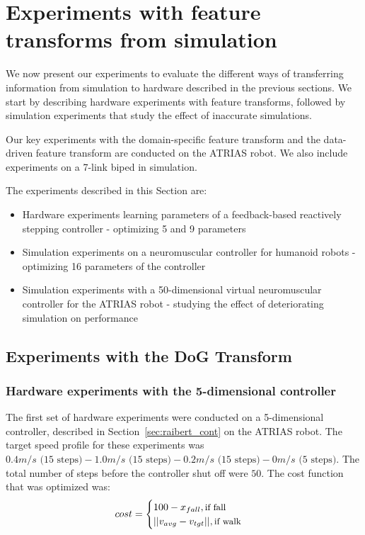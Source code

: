 \chapter{Experiments with feature transforms from simulation}


We now present our experiments to evaluate the different ways of transferring information from simulation to hardware described in the previous sections. We start by describing hardware experiments with feature transforms, followed by simulation experiments that study the effect of inaccurate simulations. 


Our key experiments with the domain-specific feature transform and the data-driven feature transform are conducted on the ATRIAS robot. We also include experiments on a 7-link biped in simulation. 

The experiments described in this Section are:
\begin{itemize}
    \item Hardware experiments learning parameters of a feedback-based reactively stepping controller - optimizing 5 and 9 parameters 
    \item Simulation experiments on a neuromuscular controller for humanoid robots - optimizing 16 parameters of the controller
    \item Simulation experiments with a 50-dimensional virtual neuromuscular controller for the ATRIAS robot -  studying the effect of deteriorating simulation on performance
\end{itemize}

\section{Experiments with the DoG Transform}

\subsection{Hardware experiments with the 5-dimensional controller}
\label{sec:hdw_5d}
The first set of hardware experiments were conducted on a 5-dimensional controller, described in Section~\ref{sec:raibert_cont} on the ATRIAS robot. The target speed profile for these experiments was $0.4 m/s \text{ (15 steps)} - 1.0 m/s \text{ (15 steps)} - 0.2 m/s \text{ (15 steps)} - 0 m/s \text{ (5 steps)}$. The total number of steps before the controller shut off were $50$. The cost function that was optimized was:
\begin{equation}
    \label{eq:hdw_cost}
    cost = 
    \begin{cases}
		100 - x_{fall} , \text{\small{if fall}} \\
		||v_{avg} - v_{tgt}||, \text{\small{if walk}}\\
	\end{cases}
\end{equation}

